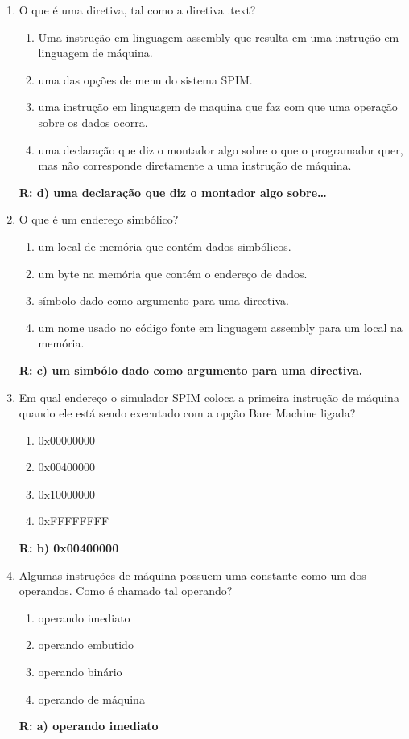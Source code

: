 \documentclass[a4paper,11pt]{article}
\begin{document}
\begin{enumerate}
    \item{O que é uma diretiva, tal como a diretiva .text?}
        \begin{enumerate}
            \item{Uma instrução em linguagem assembly que resulta em uma instrução em linguagem de
                    máquina.}
            \item{uma das opções de menu do sistema SPIM.}
            \item{uma instrução em linguagem de maquina que faz com que uma operação sobre os dados ocorra.}
            \item{uma declaração que diz o montador algo sobre o que o programador quer, mas não
                    corresponde diretamente a uma instrução de máquina.}
        \end{enumerate}
        \textbf{R: d) uma declaração que diz o montador algo sobre\dots}

    \item{O que é um endereço simbólico?}
        \begin{enumerate}
            \item{um local de memória que contém dados simbólicos.}
            \item{um byte na memória que contém o endereço de dados.}
            \item{símbolo dado como argumento para uma directiva.}
            \item{um nome usado no código fonte em linguagem assembly para um local na memória.}
        \end{enumerate}
        \textbf{R: c) um simbólo dado como argumento para uma directiva.}

        \newpage 

    \item{Em qual endereço o simulador SPIM coloca a primeira instrução de máquina quando ele está sendo
            executado com a opção Bare Machine ligada?}
        \begin{enumerate}
            \item{0x00000000}
            \item{0x00400000}
            \item{0x10000000}
            \item{0xFFFFFFFF}
        \end{enumerate}
        \textbf{R: b) 0x00400000}

    \item{Algumas instruções de máquina possuem uma constante como um dos operandos. Como é chamado tal
            operando?}
        \begin{enumerate}
            \item{operando imediato}
            \item{operando embutido}
            \item{operando binário}
            \item{operando de máquina}
        \end{enumerate}
        \textbf{R: a) operando imediato}
        

\end{enumerate}
\end{document}
